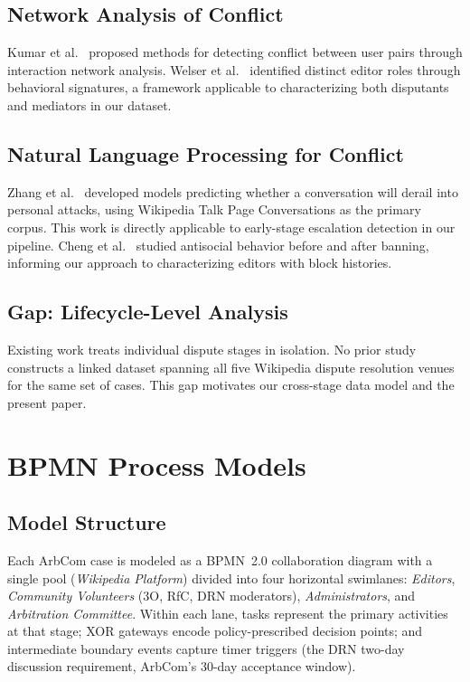 \documentclass[conference]{IEEEtran}
\begin{document}
\subsection{Network Analysis of Conflict}

Kumar et al.~\cite{b_kumar2014} proposed methods for detecting conflict between
user pairs through interaction network analysis. Welser et
al.~\cite{b_welser2011} identified distinct editor roles through behavioral
signatures, a framework applicable to characterizing both disputants and
mediators in our dataset.

\subsection{Natural Language Processing for Conflict}

Zhang et al.~\cite{b_zhang2018} developed models predicting whether a
conversation will derail into personal attacks, using Wikipedia Talk Page
Conversations as the primary corpus. This work is directly applicable to
early-stage escalation detection in our pipeline. Cheng et
al.~\cite{b_cheng2015} studied antisocial behavior before and after banning,
informing our approach to characterizing editors with block histories.

\subsection{Gap: Lifecycle-Level Analysis}

Existing work treats individual dispute stages in isolation. No prior study
constructs a linked dataset spanning all five Wikipedia dispute resolution
venues for the same set of cases. This gap motivates our cross-stage data
model and the present paper.

\section{BPMN Process Models}

\subsection{Model Structure}

Each ArbCom case is modeled as a BPMN~2.0 collaboration diagram with a single
pool (\emph{Wikipedia Platform}) divided into four horizontal swimlanes:
\emph{Editors}, \emph{Community Volunteers} (3O, RfC, DRN moderators),
\emph{Administrators}, and \emph{Arbitration Committee}. Within each lane,
tasks represent the primary activities at that stage; XOR gateways encode
policy-prescribed decision points; and intermediate boundary events capture
timer triggers (the DRN two-day discussion requirement, ArbCom's 30-day
acceptance window).
\end{document}
